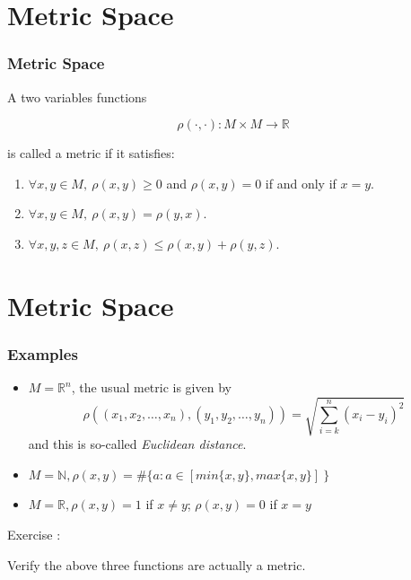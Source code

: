 \documentclass[12pt, t]{beamer}
\renewcommand{\emph}[1]{{\color{Turquoise3}\textsl{#1}}}
\begin{document}
\section{Metric Space}
\begin{frame}
    \frametitle{Metric Space}
    A two variables functions

    \begin{equation*}
        \rho(\cdot,\cdot):M\times M \rightarrow \mathbb{R}
    \end{equation*}

    is called a metric if it satisfies:

    \begin{enumerate}
        \item $\forall x,y\in M,\ \rho (x,y) \geq 0$ and $\rho (x,y)=0$ if and only if $x=y$.
        \item  $\forall x,y\in M,\ \rho (x,y)=\rho (y,x)$.
        \item  $\forall x,y,z\in M,\ \rho (x,z)\leq \rho (x,y)+\rho (y,z)$.
    \end{enumerate}


\end{frame}

\section{Metric Space}
\begin{frame}
    \frametitle{Examples}
    \begin{itemize}
        \item $M=\mathbb{R}^n$, the usual metric is given by
              \begin{equation*}
                  \rho ( (x_1,x_2,\dots,x_n), (y_1,y_2,\dots,y_n)) = \sqrt{\sum^{n}_{i=k}(x_i-y_i)^2 }
              \end{equation*}
              and this is so-called \emph{Euclidean distance}.
        \item $M=\mathbb{N}, \rho(x,y)= \#\{ a:a\in [min\{x,y\},max\{x,y\}]\ \} $
        \item $M=\mathbb{R},\rho (x,y)=1 $ if $x\neq y$; $\rho (x,y)=0$ if $x=y$
    \end{itemize}
    \vspace{1em}
    Exercise : \\
    \begin{center}
        Verify the above three functions are actually a metric.
    \end{center}
\end{frame}
\end{document}
